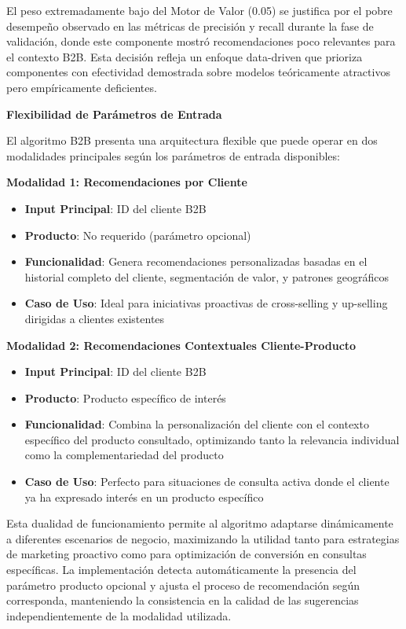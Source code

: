 \documentclass[twocolumn]{article}
\begin{document}
El peso extremadamente bajo del Motor de Valor (0.05) se justifica por el pobre desempeño observado en las métricas de precisión y recall durante la fase de validación, donde este componente mostró recomendaciones poco relevantes para el contexto B2B. Esta decisión refleja un enfoque data-driven que prioriza componentes con efectividad demostrada sobre modelos teóricamente atractivos pero empíricamente deficientes.

\textbf{Flexibilidad de Parámetros de Entrada}

El algoritmo B2B presenta una arquitectura flexible que puede operar en dos modalidades principales según los parámetros de entrada disponibles:

\textbf{Modalidad 1: Recomendaciones por Cliente}
\begin{itemize}
    \item \textbf{Input Principal}: ID del cliente B2B
    \item \textbf{Producto}: No requerido (parámetro opcional)
    \item \textbf{Funcionalidad}: Genera recomendaciones personalizadas basadas en el historial completo del cliente, segmentación de valor, y patrones geográficos
    \item \textbf{Caso de Uso}: Ideal para iniciativas proactivas de cross-selling y up-selling dirigidas a clientes existentes
\end{itemize}

\textbf{Modalidad 2: Recomendaciones Contextuales Cliente-Producto}
\begin{itemize}
    \item \textbf{Input Principal}: ID del cliente B2B
    \item \textbf{Producto}: Producto específico de interés
    \item \textbf{Funcionalidad}: Combina la personalización del cliente con el contexto específico del producto consultado, optimizando tanto la relevancia individual como la complementariedad del producto
    \item \textbf{Caso de Uso}: Perfecto para situaciones de consulta activa donde el cliente ya ha expresado interés en un producto específico
\end{itemize}

Esta dualidad de funcionamiento permite al algoritmo adaptarse dinámicamente a diferentes escenarios de negocio, maximizando la utilidad tanto para estrategias de marketing proactivo como para optimización de conversión en consultas específicas. La implementación detecta automáticamente la presencia del parámetro producto opcional y ajusta el proceso de recomendación según corresponda, manteniendo la consistencia en la calidad de las sugerencias independientemente de la modalidad utilizada.
\end{document}
